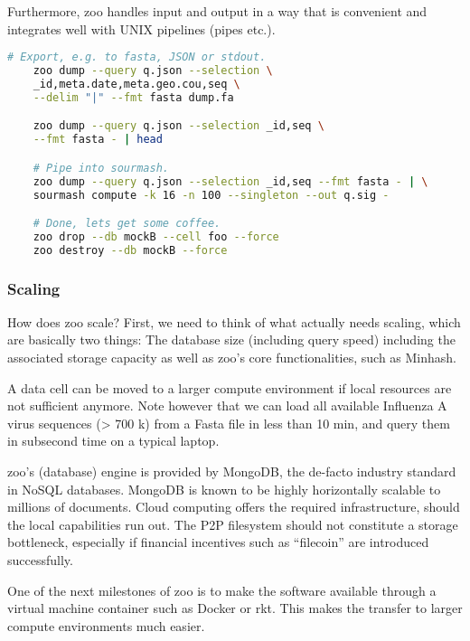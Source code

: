 Furthermore, zoo handles input and output in a way that is convenient and integrates well with UNIX pipelines (pipes etc.).


\begin{minipage}{\linewidth}
\begin{lstlisting}[language=bash]
    # Export, e.g. to fasta, JSON or stdout.
    zoo dump --query q.json --selection \
    _id,meta.date,meta.geo.cou,seq \
    --delim "|" --fmt fasta dump.fa

    zoo dump --query q.json --selection _id,seq \
    --fmt fasta - | head

    # Pipe into sourmash.
    zoo dump --query q.json --selection _id,seq --fmt fasta - | \
    sourmash compute -k 16 -n 100 --singleton --out q.sig -

    # Done, lets get some coffee.
    zoo drop --db mockB --cell foo --force
    zoo destroy --db mockB --force
\end{lstlisting}
\end{minipage}


\subsubsection{Scaling}

How does zoo scale? First, we need to think of what actually needs scaling, which are basically two things: The database size (including query speed) including the associated storage capacity as well as zoo’s core functionalities, such as Minhash.

A data cell can be moved to a larger compute environment if local resources are not sufficient anymore. Note however that we can load all available Influenza A virus sequences (> 700 k) from a Fasta file in less than 10 min, and query them in subsecond time on a typical laptop.

zoo's (database) engine is provided by MongoDB, the de-facto industry standard in NoSQL databases. MongoDB is known to be highly horizontally scalable to millions of documents. Cloud computing offers the required infrastructure, should the local capabilities run out. The P2P filesystem should not constitute a storage bottleneck, especially if financial incentives such as ``filecoin'' are introduced successfully.

One of the next milestones of zoo is to make the software available through a virtual machine container such as Docker or rkt. This makes the transfer to larger compute environments much easier.


